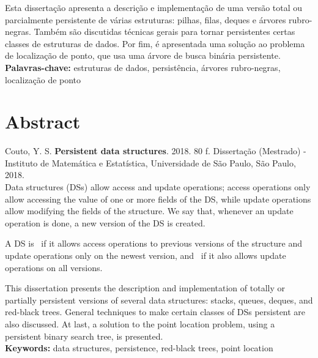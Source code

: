 \documentclass[11pt,oneside,a4paper, openany]{book}
\begin{document}
Esta dissertação apresenta a descrição e implementação de uma versão total ou parcialmente persistente de várias estruturas: pilhas, filas, deques e árvores rubro-negras. Também são discutidas técnicas gerais para tornar persistentes certas classes de estruturas de dados. Por fim, é apresentada uma solução ao problema de localização de ponto, que usa uma árvore de busca binária persistente.
\\

\noindent \textbf{Palavras-chave:} estruturas de dados, persistência, árvores rubro-negras, localização de ponto

\chapter*{Abstract}
\noindent Couto, Y. S. \textbf{Persistent data structures}. 
2018. 80 f.
Dissertação (Mestrado) - Instituto de Matemática e Estatística,
Universidade de São Paulo, São Paulo, 2018.
\\

Data structures (DSs) allow access and update operations; access operations only allow accessing the value of one or more fields of the DS, while update operations allow modifying the fields of the structure. We say that, whenever an update operation is done, a new version of the DS is created.

A DS is~ if it allows access operations to previous versions of the structure and update operations only on the newest version, and~ if it also allows update operations on all versions.

This dissertation presents the description and implementation of totally or partially persistent versions of several data structures: stacks, queues, deques, and red-black trees. General techniques to make certain classes of DSs persistent are also discussed. At last, a solution to the point location problem, using a persistent binary search tree, is presented.
\\

\noindent \textbf{Keywords:} data structures, persistence, red-black trees, point location


\setcounter{tocdepth}{1}

\begingroup
\let\cleardoublepage\clearpage
\tableofcontents
\endgroup

\mainmatter
{}
\end{document}
